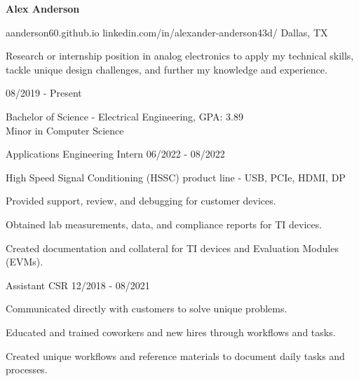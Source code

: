 \documentclass[11pt]{article}
\begin{document}
\centerline{{\Huge \bf Alex Anderson}}

\bigskip

        {aanderson60.github.io}
        {linkedin.com/in/alexander-anderson43d/}
        {Dallas, TX}

Research or internship position in analog electronics to apply my technical skills, tackle unique design challenges, and further my knowledge and experience.


\begin{description}
\squish
{}
            {}
            {08/2019 - Present}

Bachelor of Science - Electrical Engineering, GPA: 3.89\\
Minor in Computer Science 

\end{description}


\begin{description}
      \squish
                 {Applications Engineering Intern}
                 {06/2022 - 08/2022}
      
      High Speed Signal Conditioning (HSSC) product line - USB, PCIe, HDMI, DP
      
      Provided support, review, and debugging for customer devices.
      
      Obtained lab measurements, data, and compliance reports for TI devices.
      
      Created documentation and collateral for TI devices and Evaluation Modules (EVMs).
      
\end{description}

\begin{description}
\squish
{}
           {Assistant CSR}
           {12/2018 - 08/2021}

Communicated directly with customers to solve unique problems.

Educated and trained coworkers and new hires through workflows and tasks.

Created unique workflows and reference materials to document daily tasks and processes.

\end{description}
\end{document}
